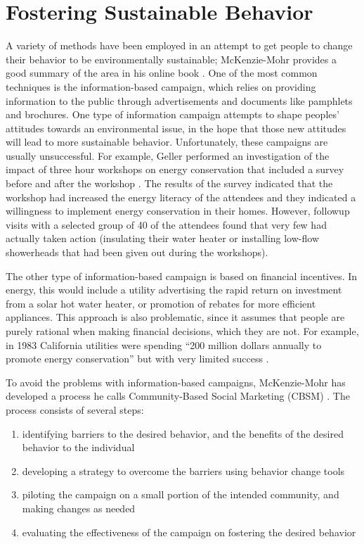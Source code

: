 \section{Fostering Sustainable Behavior}
\label{sec:fostering-behavior}

A variety of methods have been employed in an attempt to get people to change their behavior to be environmentally sustainable; McKenzie-Mohr provides a good summary of the area in his online book \cite{McKenzie-Mohr2009}. One of the most common techniques is the information-based campaign, which relies on providing information to the public through advertisements and documents like pamphlets and brochures. One type of information campaign attempts to shape peoples' attitudes towards an environmental issue, in the hope that those new attitudes will lead to more sustainable behavior. Unfortunately, these campaigns are usually unsuccessful. For example, Geller performed an investigation of the impact of three hour workshops on energy conservation that included a survey before and after the workshop \cite{Geller81}. The results of the survey indicated that the workshop had increased the energy literacy of the attendees and they indicated a willingness to implement energy conservation in their homes. However, followup visits with a selected group of 40 of the attendees found that very few had actually taken action (insulating their water heater or installing low-flow showerheads that had been given out during the workshops).

The other type of information-based campaign is based on financial incentives. In energy, this would include a utility advertising the rapid return on investment from a solar hot water heater, or promotion of rebates for more efficient appliances. This approach is also problematic, since it assumes that people are purely rational when making financial decisions, which they are not. For example, in 1983 California utilities were spending ``200 million dollars annually to promote energy conservation'' but with very limited success \cite{Costanzo86}.

To avoid the problems with information-based campaigns, McKenzie-Mohr has developed a process he calls Community-Based Social Marketing (CBSM) \cite{McKenzie-Mohr2009}. The process consists of several steps:

\begin{enumerate}
	\item identifying barriers to the desired behavior, and the benefits of the desired behavior to the individual
	\item developing a strategy to overcome the barriers using behavior change tools
	\item piloting the campaign on a small portion of the intended community, and making changes as needed
	\item evaluating the effectiveness of the campaign on fostering the desired behavior
\end{enumerate}

